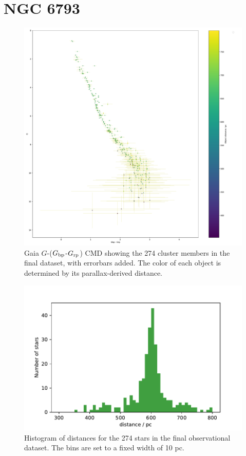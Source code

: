 \documentclass[12pt, a4paper]{report}
\begin{document}
\section{NGC 6793}

\begin{figure}[h!]
\begin{center}
\includegraphics[width=1.0\textwidth]{../NGC_6793_CMD_observational_errorbars.pdf}
\caption{Gaia $G$-($G_{\textnormal{bp}}$-$G_{\textnormal{rp}}$) CMD showing the 274 cluster members in the final dataset, with errorbars added. The color of each object is determined by its parallax-derived distance.}
\label{NGC_6793_obs_only}
\end{center}
\end{figure}

\begin{figure}[h]
\begin{center}
\includegraphics[width=1.0\textwidth]{../NGC_6793_distances_hist.pdf}
\caption{Histogram of distances for the 274 stars in the final observational dataset. The bins are set to a fixed width of 10 pc.}
\label{NGC_6793_dist_hist}
\end{center}
\end{figure}
\end{document}

